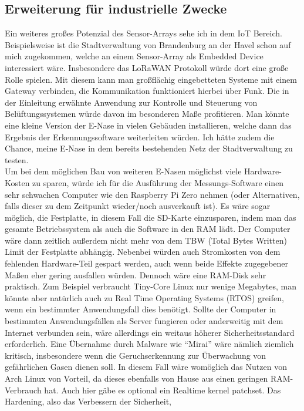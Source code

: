 \documentclass[10pt]{article}
\begin{document}
\subsection{Erweiterung für industrielle Zwecke}
Ein weiteres großes Potenzial des Sensor-Arrays sehe ich in dem IoT Bereich.
Beispielsweise ist die Stadtverwaltung von Brandenburg an der Havel schon auf mich zugekommen, welche an einem Sensor-Array als Embedded Device interessiert wäre.
Insbesondere das LoRaWAN \autocite{LoRaWAN} Protokoll würde dort eine große Rolle spielen. Mit diesem kann man großflächig eingebetteten Systeme mit einem Gateway verbinden, 
die Kommunikation funktioniert hierbei über Funk. Die in der Einleitung erwähnte Anwendung zur Kontrolle und Steuerung von Belüftungssystemen würde davon im besonderen Maße profitieren. 
Man könnte eine kleine Version der E-Nase in vielen Gebäuden installieren, welche dann das Ergebnis der Erkennungssoftware weiterleiten würden. Ich hätte zudem die Chance, meine E-Nase
in dem bereits bestehenden Netz der Stadtverwaltung zu testen.\\
Um bei dem möglichen Bau von weiteren E-Nasen möglichst viele Hardware-Kosten zu sparen, würde ich für die Ausführung der Messungs-Software einen sehr schwachen Computer 
wie den Raspberry Pi Zero nehmen (oder Alternativen, falls dieser zu dem Zeitpunkt wieder/noch ausverkauft ist). Es wäre sogar möglich, 
die Festplatte, in diesem Fall die SD-Karte einzusparen, indem man das gesamte Betriebssystem als auch die Software
in den RAM lädt. Der Computer wäre dann zeitlich außerdem nicht mehr von dem TBW (Total Bytes Written) Limit der Festplatte abhängig. Nebenbei würden auch Stromkosten von dem
fehlenden Hardware-Teil gespart werden, auch wenn beide Effekte zugegebener Maßen eher gering ausfallen würden. Dennoch wäre eine RAM-Disk sehr praktisch.
Zum Beispiel verbraucht Tiny-Core Linux \autocite{piCore} nur wenige Megabytes, man könnte aber natürlich auch zu 
Real Time Operating Systems (RTOS) greifen, wenn ein bestimmter Anwendungsfall dies benötigt. Sollte der Computer in bestimmten Anwendungsfällen als Server fungieren oder anderweitig mit dem
Internet verbunden sein, wäre allerdings ein weitaus höherer Sicherheitsstandard erforderlich. Eine Übernahme durch Malware wie "`Mirai"' \autocite{Mirai} wäre nämlich ziemlich kritisch, insbesondere
wenn die Geruchserkennung zur Überwachung von gefährlichen Gasen dienen soll. In diesem Fall wäre womöglich das Nutzen von Arch Linux von Vorteil, da dieses ebenfalls von Hause aus einen
geringen RAM-Verbrauch hat. Auch hier gäbe es optional ein Realtime kernel patchset. Das Hardening, also das Verbessern der Sicherheit, 
\end{document}
